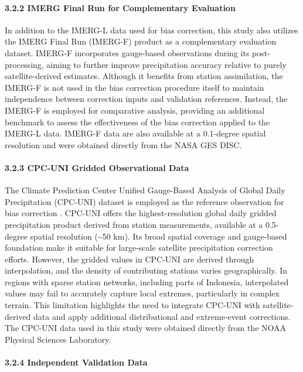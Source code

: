 \documentclass[
]{article}
\begin{document}
\paragraph{3.2.2 IMERG Final Run for Complementary
Evaluation}

In addition to the IMERG-L data used for bias correction, this study
also utilizes the IMERG Final Run (IMERG-F) product as a complementary
evaluation dataset. IMERG-F incorporates gauge-based observations during
its post-processing, aiming to further improve precipitation accuracy
relative to purely satellite-derived estimates. Although it benefits
from station assimilation, the IMERG-F is not used in the bias
correction procedure itself to maintain independence between correction
inputs and validation references. Instead, the IMERG-F is employed for
comparative analysis, providing an additional benchmark to assess the
effectiveness of the bias correction applied to the IMERG-L data.
IMERG-F data are also available at a 0.1-degree spatial resolution and
were obtained directly from the NASA GES DISC.

\paragraph{3.2.3 CPC-UNI Gridded Observational
Data}\label{cpc-uni-gridded-observational-data}

The Climate Prediction Center Unified Gauge-Based Analysis of Global
Daily Precipitation (CPC-UNI) dataset is employed as the reference
observation for bias correction \cite{ref13,ref18}. CPC-UNI offers the
highest-resolution global daily gridded precipitation product derived
from station measurements, available at a 0.5-degree spatial resolution
(\textasciitilde50 km). Its broad spatial coverage and gauge-based
foundation make it suitable for large-scale satellite precipitation
correction efforts. However, the gridded values in CPC-UNI are derived
through interpolation, and the density of contributing stations varies
geographically. In regions with sparse station networks, including parts
of Indonesia, interpolated values may fail to accurately capture local
extremes, particularly in complex terrain. This limitation highlights
the need to integrate CPC-UNI with satellite-derived data and apply
additional distributional and extreme-event corrections. The CPC-UNI
data used in this study were obtained directly from the NOAA Physical
Sciences Laboratory.

\paragraph{3.2.4 Independent Validation
Data}\label{independent-validation-data}
\end{document}
